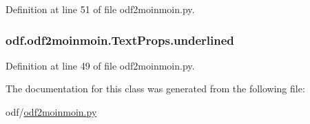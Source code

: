 Definition at line 51 of file odf2moinmoin.\+py.

\hypertarget{classodf_1_1odf2moinmoin_1_1TextProps_a6f12b62f5a4bb4a3e64d963858a628e9}{
\subsubsection[{underlined}]{\setlength{\rightskip}{0pt plus 5cm}odf.\+odf2moinmoin.\+Text\+Props.\+underlined}}\label{classodf_1_1odf2moinmoin_1_1TextProps_a6f12b62f5a4bb4a3e64d963858a628e9}


Definition at line 49 of file odf2moinmoin.\+py.



The documentation for this class was generated from the following file\+:\begin{DoxyCompactItemize}
\item 
odf/\hyperlink{odf2moinmoin_8py}{odf2moinmoin.\+py}\end{DoxyCompactItemize}
